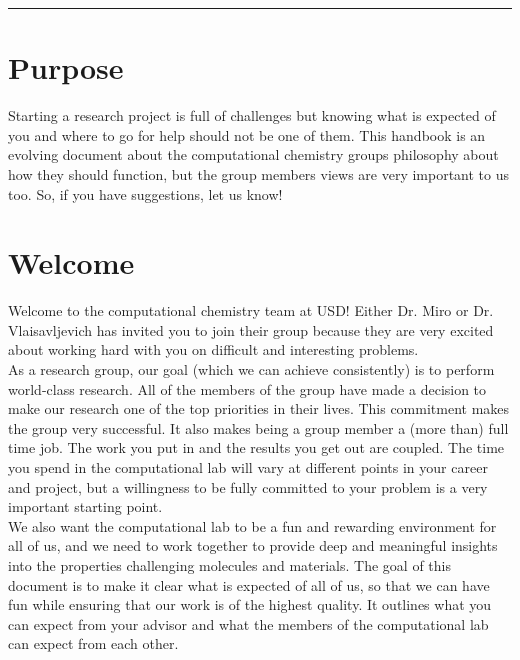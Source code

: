 \documentclass[letterpaper]{article}
\begin{document}

\noindent\rule{16.5cm}{1.5pt}


\section{Purpose}
Starting a research project is full of challenges but knowing what is expected of you and where to go for help should not be one of them. This handbook is an evolving document about the computational chemistry groups philosophy about how they should function, but the group members views are very important to us too. So, if you have suggestions, let us know!

\section{Welcome}
Welcome to the computational chemistry team at USD!  Either Dr. Miro or Dr. Vlaisavljevich has invited you to join their group because they are very excited about working hard with you on difficult and interesting problems.\\

As a research group, our goal (which we can achieve consistently) is to perform world-class research. All of the members of the group have made a decision to make our research one of the top priorities in their lives. This commitment makes the group very successful. It also makes being a group member a (more than) full time job. The work you put in and the results you get out are coupled. The time you spend in the computational lab will vary at different points in your career and project, but a willingness to be fully committed to your problem is a very important starting point.\\

We also want the computational lab to be a fun and rewarding environment for all of us, and we need to work together to provide deep and meaningful insights into the properties challenging molecules and materials. The goal of this document is to make it clear what is expected of all of us, so that we can have fun while ensuring that our work is of the highest quality. It outlines what you can expect from your advisor and what the members of the computational lab can expect from each other.\\
\end{document}
